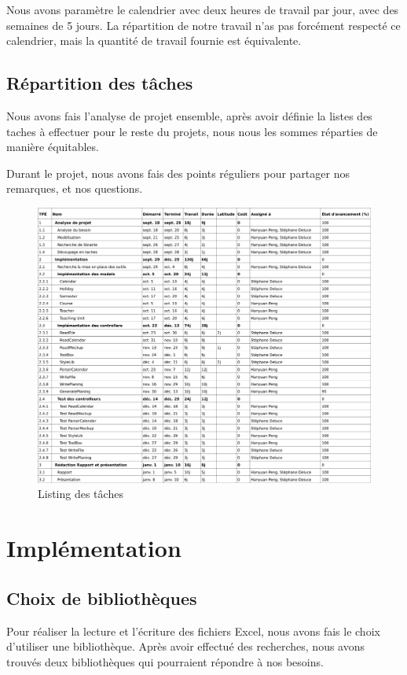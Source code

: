 \documentclass{polytech/polytech}
\begin{document}
	Nous avons paramètre le calendrier avec deux heures de travail par jour, avec des semaines de 5 jours.
	La répartition de notre travail n'as pas forcément respecté ce calendrier, mais la quantité de travail fournie est équivalente.

	\section{Répartition des tâches}

	Nous avons fais l'analyse de projet ensemble, après avoir définie la listes des taches à effectuer pour le reste du projets, nous nous les sommes réparties de manière équitables.

	Durant le projet, nous avons fais des points réguliers pour partager nos remarques, et nos questions.

	\begin{figure}
		\caption{Listing des tâches}
		\includegraphics[width=\textwidth]{./img/taches-list.png}
	\end{figure}

	\chapter{Implémentation}

	\section{Choix de bibliothèques}

	Pour réaliser la lecture et l'écriture des fichiers Excel, nous avons fais le choix d'utiliser une bibliothèque.
	Après avoir effectué des recherches, nous avons trouvés deux bibliothèques qui pourraient répondre à nos besoins.
\end{document}
